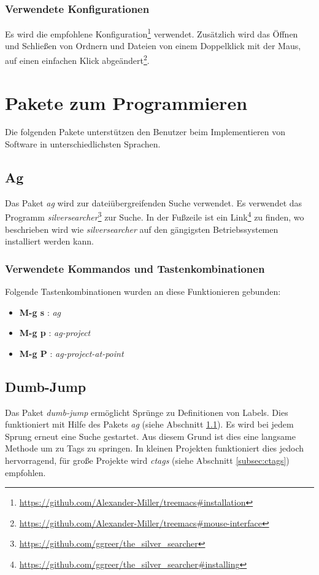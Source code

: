 \subsubsection{Verwendete Konfigurationen}
Es wird die empfohlene
Konfiguration\footnote{\url{https://github.com/Alexander-Miller/treemacs\#installation}}
verwendet. Zusätzlich wird das Öffnen und Schließen von Ordnern und
Dateien von einem Doppelklick mit der Maus, auf einen einfachen Klick
abgeändert\footnote{\url{https://github.com/Alexander-Miller/treemacs\#mouse-interface}}.

\section{Pakete zum Programmieren}
Die folgenden Pakete unterstützen den Benutzer beim Implementieren von
Software in unterschiedlichsten Sprachen.\\

\subsection{Ag}
\label{subsec:ag}
Das Paket \textit{ag} wird zur dateiübergreifenden Suche verwendet. Es
verwendet das Programm
\textit{silversearcher}\footnote{\url{https://github.com/ggreer/the_silver_searcher}}
zur Suche. In der Fußzeile ist ein
Link\footnote{\url{https://github.com/ggreer/the_silver_searcher\#installing}}
zu finden, wo beschrieben wird wie \textit{silversearcher} auf den
gängigsten Betriebssystemen installiert werden kann. \cite{Ag}\\

\subsubsection{Verwendete Kommandos und Tastenkombinationen}
Folgende Tastenkombinationen wurden an diese Funktionieren gebunden:
\begin{itemize}
\item \textbf{M-g s} : \textit{ag}
\item \textbf{M-g p} : \textit{ag-project}
\item \textbf{M-g P} : \textit{ag-project-at-point}
\end{itemize}

\subsection{Dumb-Jump}
\label{subsec:dumbjump}
Das Paket \textit{dumb-jump} ermöglicht Sprünge zu Definitionen von
Labels. Dies funktioniert mit Hilfe des Pakets \textit{ag} (siehe
Abschnitt \ref{subsec:ag}). Es wird bei jedem Sprung erneut eine Suche
gestartet. Aus diesem Grund ist dies eine langsame Methode um zu Tags
zu springen. In kleinen Projekten funktioniert dies jedoch
hervorragend, für große Projekte wird \textit{ctags} (siehe Abschnitt
\ref{subsec:ctags}) empfohlen. \cite{DumbJump}\\

